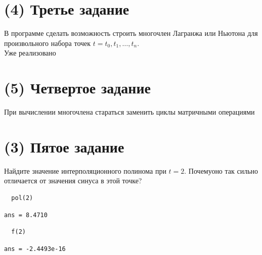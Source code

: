 \section{(4) Третье задание}
В программе сделать возможность строить многочлен Лагранжа или Ньютона для произвольного набора точек $t = t_{0}, t_{1}, \ldots, t_{n}$.\\[2mm]
Уже реализовано


\section{(5) Четвертое задание}
При вычислении многочлена стараться заменить циклы матричными операциями


\section{(3) Пятое задание}
Найдите значение интерполяционного полинома при $t = 2$. Почемуоно так сильно отличается от значения синуса в этой точке?\\[2mm]
\begin{lstlisting}
  pol(2)
\end{lstlisting}

\begin{lstlisting}[backgroundcolor=\color{cyan}]
  ans = 8.4710
\end{lstlisting}

\begin{lstlisting}
  f(2)
\end{lstlisting}

\begin{lstlisting}[backgroundcolor=\color{cyan}]
  ans = -2.4493e-16
\end{lstlisting}
